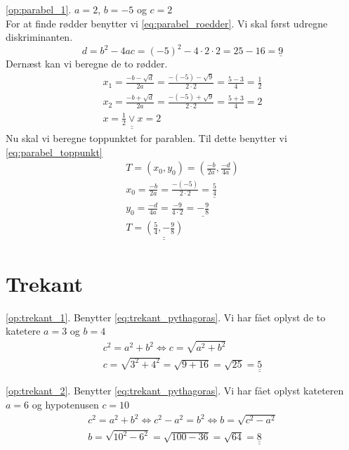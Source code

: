 \documentclass[11pt,a5paper,fleqn,leqno]{book}
\begin{document}
\ref{op:parabel_1}. $a = 2$, $b = -5$ og $c = 2$ \\
For at finde rødder benytter vi \eqref{eq:parabel_roedder}. Vi skal først udregne diskriminanten.
\[d = b^2 - 4ac = (-5)^2 - 4 \cdot 2 \cdot 2 = 25 - 16 = \underline{9}\]
Dernæst kan vi beregne de to rødder.
\begin{displaymath}\begin{array}{l}
x_1 = \frac{-b-\sqrt{d}}{2a} = \frac{-(-5) - \sqrt{9}}{2 \cdot 2} = \frac{5 - 3}{4} = \frac{1}{2} \\
x_2 = \frac{-b+\sqrt{d}}{2a} = \frac{-(-5) + \sqrt{9}}{2 \cdot 2} = \frac{5 + 3}{4} = 2 \\
\underline{\underline{x = \frac{1}{2} \vee x = 2}}
\end{array}\end{displaymath}
Nu skal vi beregne toppunktet for parablen. Til dette benytter vi \eqref{eq:parabel_toppunkt}
\begin{displaymath}\begin{array}{l}
T = \left(x_0,y_0\right) = \left(\frac{-b}{2a},\frac{-d}{4a}\right) \\
x_0 = \frac{-b}{2a} = \frac{-(-5)}{2 \cdot 2} = \underline{\frac{5}{4}} \\
y_0 = \frac{-d}{4a} = \frac{-9}{4 \cdot 2} = \underline{-\frac{9}{8}} \\
T = \underline{\underline{\left(\frac{5}{4}, -\frac{9}{8}\right)}}
\end{array}\end{displaymath}

\section{Trekant}

\ref{op:trekant_1}. Benytter \eqref{eq:trekant_pythagoras}. Vi har fået oplyst de to katetere $a = 3$ og $b = 4$
\begin{displaymath}\begin{array}{l}
c^2 = a^2 + b^2 \Leftrightarrow c = \sqrt{a^2 + b^2} \\
c = \sqrt{3^2 + 4^2} = \sqrt{9 + 16} = \sqrt{25} = \underline{\underline{5}}
\end{array}\end{displaymath}

\ref{op:trekant_2}. Benytter \eqref{eq:trekant_pythagoras}. Vi har fået oplyst kateteren $a = 6$ og hypotenusen $c = 10$
\begin{displaymath}\begin{array}{l}
c^2 = a^2 + b^2 \Leftrightarrow c^2 - a^2 = b^2 \Leftrightarrow b = \sqrt{c^2 - a^2} \\
b = \sqrt{10^2 - 6^2} = \sqrt{100 - 36} = \sqrt{64} = \underline{\underline{8}}
\end{array}\end{displaymath}
\end{document}
